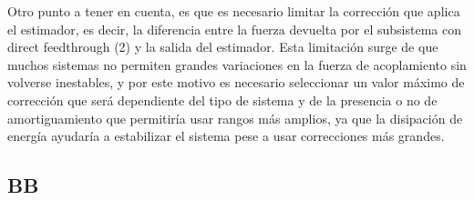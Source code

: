 Otro punto a tener en cuenta, es que es necesario limitar la corrección que aplica el estimador, es decir, la diferencia entre la fuerza devuelta por el subsistema con direct feedthrough (2) y la salida del estimador.
Esta limitación surge de que muchos sistemas no permiten grandes variaciones en la fuerza de acoplamiento sin volverse inestables, y por este motivo es necesario seleccionar un valor máximo de corrección que será dependiente del tipo de sistema y de la presencia o no de amortiguamiento que permitiría usar rangos más amplios, ya que la disipación de energía ayudaría a estabilizar el sistema pese a usar correcciones más grandes.

\subsection{BB}


